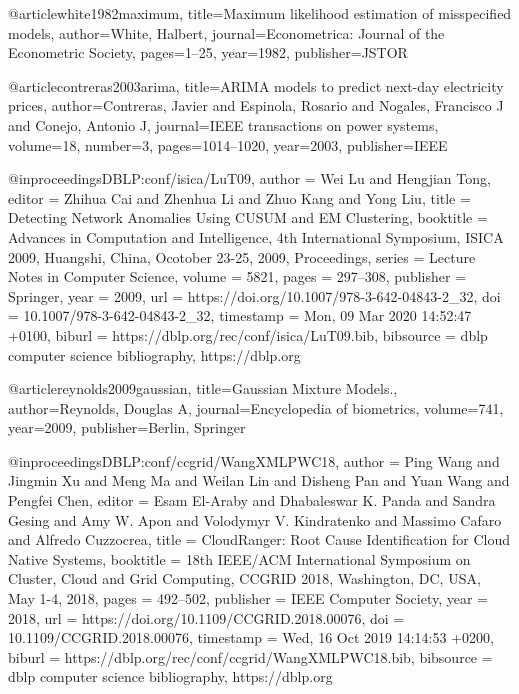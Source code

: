 @article{white1982maximum,
  title={Maximum likelihood estimation of misspecified models},
  author={White, Halbert},
  journal={Econometrica: Journal of the Econometric Society},
  pages={1--25},
  year={1982},
  publisher={JSTOR}
}

@article{contreras2003arima,
  title={ARIMA models to predict next-day electricity prices},
  author={Contreras, Javier and Espinola, Rosario and Nogales, Francisco J and Conejo, Antonio J},
  journal={IEEE transactions on power systems},
  volume={18},
  number={3},
  pages={1014--1020},
  year={2003},
  publisher={IEEE}
}

@inproceedings{DBLP:conf/isica/LuT09,
  author    = {Wei Lu and
               Hengjian Tong},
  editor    = {Zhihua Cai and
               Zhenhua Li and
               Zhuo Kang and
               Yong Liu},
  title     = {Detecting Network Anomalies Using {CUSUM} and {EM} Clustering},
  booktitle = {Advances in Computation and Intelligence, 4th International Symposium,
               {ISICA} 2009, Huangshi, China, Ocotober 23-25, 2009, Proceedings},
  series    = {Lecture Notes in Computer Science},
  volume    = {5821},
  pages     = {297--308},
  publisher = {Springer},
  year      = {2009},
  url       = {https://doi.org/10.1007/978-3-642-04843-2\_32},
  doi       = {10.1007/978-3-642-04843-2\_32},
  timestamp = {Mon, 09 Mar 2020 14:52:47 +0100},
  biburl    = {https://dblp.org/rec/conf/isica/LuT09.bib},
  bibsource = {dblp computer science bibliography, https://dblp.org}
}

@article{reynolds2009gaussian,
  title={Gaussian Mixture Models.},
  author={Reynolds, Douglas A},
  journal={Encyclopedia of biometrics},
  volume={741},
  year={2009},
  publisher={Berlin, Springer}
}


@inproceedings{DBLP:conf/ccgrid/WangXMLPWC18,
  author    = {Ping Wang and
               Jingmin Xu and
               Meng Ma and
               Weilan Lin and
               Disheng Pan and
               Yuan Wang and
               Pengfei Chen},
  editor    = {Esam El{-}Araby and
               Dhabaleswar K. Panda and
               Sandra Gesing and
               Amy W. Apon and
               Volodymyr V. Kindratenko and
               Massimo Cafaro and
               Alfredo Cuzzocrea},
  title     = {CloudRanger: Root Cause Identification for Cloud Native Systems},
  booktitle = {18th {IEEE/ACM} International Symposium on Cluster, Cloud and Grid
               Computing, {CCGRID} 2018, Washington, DC, USA, May 1-4, 2018},
  pages     = {492--502},
  publisher = {{IEEE} Computer Society},
  year      = {2018},
  url       = {https://doi.org/10.1109/CCGRID.2018.00076},
  doi       = {10.1109/CCGRID.2018.00076},
  timestamp = {Wed, 16 Oct 2019 14:14:53 +0200},
  biburl    = {https://dblp.org/rec/conf/ccgrid/WangXMLPWC18.bib},
  bibsource = {dblp computer science bibliography, https://dblp.org}
}

